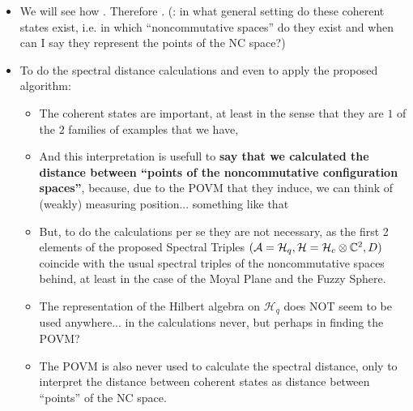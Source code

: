 \documentclass{article}
\begin{document}
\begin{itemize}
\begin{itemize}
\begin{itemize}
            \end{itemize}
        
        \item We will see how . Therefore . (: in what general setting do these coherent states exist, i.e. in which ``noncommutative spaces'' do they exist and when can I say they represent the points of the NC space?)
        
        \item To do the spectral distance calculations and even to apply the proposed algorithm:
        
            \begin{itemize}
                
            \item The coherent states are important, at least in the sense that they are $1$ of the $2$ families of examples that we have,
            
            \item And this interpretation is usefull to \textbf{say that we calculated the distance between ``points of the noncommutative configuration spaces''}, because, due to the POVM that they induce, we can think of (weakly) measuring position... something like that
            
            \item But, to do the calculations per se they are not necessary, as the first 2 elements of the proposed Spectral Triples $(\mathcal A = \mathcal H_q, \mathcal H = \mathcal H_c \otimes \mathbb{C}^2, D)$ coincide with the usual spectral triples of the noncommutative spaces behind, at least in the case of the Moyal Plane and the Fuzzy Sphere.
            
            \item The representation of the Hilbert algebra on $\mathcal H_q$ does NOT seem to be used anywhere... in the calculations never, but perhaps in finding the POVM?
            
            \item The POVM is also never used to calculate the spectral distance, only to interpret the distance between coherent states as distance between ``points'' of the NC space. 
            

\end{itemize}
\end{itemize}
\end{itemize}
\end{document}
